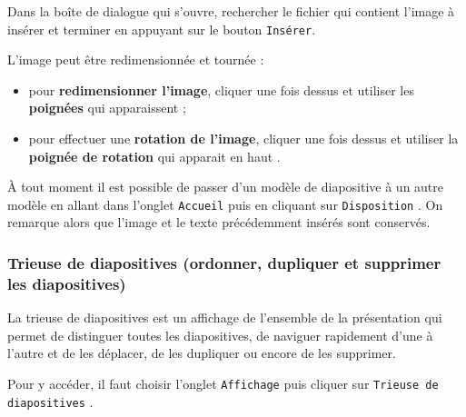 
Dans la boîte de dialogue qui s'ouvre, rechercher le fichier qui contient l'image à insérer et terminer en appuyant sur le bouton \texttt{Insérer}.

\vspace{1em}

L'image peut être redimensionnée et tournée :\label{poigneeTourneZoom} 

\begin{itemize}
\item pour \textbf{redimensionner l'image}, cliquer une fois dessus et utiliser les \textbf{poignées} qui apparaissent  ;
\item pour effectuer une \textbf{rotation de l'image}, cliquer une fois dessus et utiliser la \textbf{poignée de rotation} qui apparait en haut .
\end{itemize}


À tout moment il est possible de passer d'un modèle de diapositive à un autre modèle en allant dans l'onglet \texttt{Accueil}  puis en cliquant sur \texttt{Disposition} . On remarque alors que l'image et le texte précédemment insérés sont conservés.




\subsubsection{Trieuse de diapositives (ordonner, dupliquer et supprimer les diapositives)}\label{Presentation1trieuse}

La trieuse de diapositives est un affichage de l'ensemble de la présentation qui permet de distinguer toutes les diapositives, de naviguer rapidement d'une à l'autre et de les déplacer, de les dupliquer ou encore de les supprimer.

Pour y accéder, il faut choisir l'onglet \texttt{Affichage}  puis cliquer sur \texttt{Trieuse de diapositives} .

